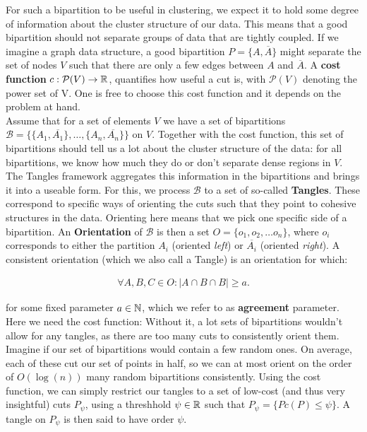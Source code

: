 For such a bipartition to be useful in clustering, we expect it to hold some degree of information about the cluster 
structure of our data. This means that a good bipartition should not separate groups of data that are tightly coupled.
If we imagine a graph data structure, a good bipartition $P = \{A, \overline{A}\}$ might separate the set of nodes $V$ such that there 
are only a few edges between $A$ and $\overline{A}$. A \textbf{cost function} 
$c: \mathcal{P}(V) \to \mathbb{R}$, quantifies how useful a cut is, with $\mathcal{P}(V)$ denoting the power set of V. One is free to choose this cost function and it depends on the problem at hand. 
\\
Assume that for a set of elements $V$ we have a set of bipartitions $\mathcal{B} = \{\{A_1, \overline{A_1}\}, \ldots, \{A_n, \overline{A_n}\} \} $ on $V$.
Together with the cost function, this set of bipartitions should tell us a lot about the cluster structure of the data:
for all bipartitions, we know how much they do or don't separate dense regions in $V$. The Tangles framework aggregates
this information in the bipartitions and brings it into a useable form. For this, we process $\mathcal{B}$ to a set of so-called \textbf{Tangles}. These
correspond to specific ways of orienting the cuts such that they point to cohesive structures in the data. 
Orienting here means that we pick one specific side of a bipartition. An \textbf{Orientation} of $\mathcal{B}$ is then a set $O = \{o_1, o_2, \ldots o_n\}$, where $o_i$ 
corresponds to either the partition $A_i$ (oriented \textit{left}) or $\overline{A_i}$ (oriented \textit{right}). A consistent orientation (which we also call a Tangle) is an orientation for which:

\begin{align}
    \forall A,B,C \in O: \left| A \cap B \cap B \right| \ge a
.\end{align}

for some fixed parameter $a \in \mathbb{N}$, which we refer to as \textbf{agreement} parameter. Here we need the cost function: Without it, a lot
sets of bipartitions wouldn't allow for any tangles, as there are too many cuts to consistently orient them. Imagine if our set of bipartitions would 
contain a few random ones. On average, each of these cut our set of points in half, so we can at most orient on the order of $O(\log(n))$ many random bipartitions consistently.
Using the cost function, we can simply restrict our tangles to a set of low-cost (and thus very insightful) cuts $P_{\psi}$, using a threshhold $\psi \in \mathbb{R}$ such that
$P_{\psi} = \{ P c(P) \le \psi \}$. A tangle on $P_{\psi}$ is then said to have order $\psi$.


